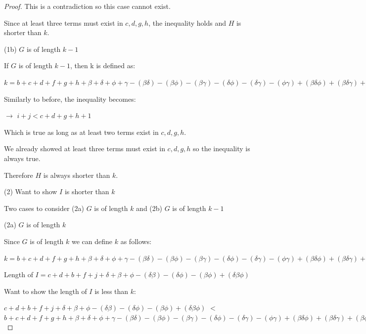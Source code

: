 \documentclass[manuscript]{acmart}
\begin{document}
\begin{proof}
        This is a contradiction so this case cannot exist.

        Since at least three terms must exist in {$c, d, g, h$}, the
        inequality holds and $H$ is shorter than $k$.

        (1b) $G$ is of length $k - 1$

        If $G$ is of length $k - 1$, then k is defined as:

        $k = b + c + d + f + g + h
            + \beta + \delta + \phi + \gamma
            - (\beta \delta) - (\beta \phi) - (\beta \gamma) - (\delta \phi) - (\delta \gamma) -(\phi \gamma)
            + (\beta \delta \phi) + (\beta \delta \gamma) + (\beta \phi \gamma) + (\delta \phi \gamma)
            - (\beta \delta \phi \gamma)
            + 1
        $

        Similarly to before, the inequality becomes:

        $\rightarrow$ $i + j < c + d + g + h + 1$

        Which is true as long as at least two terms exist in {$c, d, g, h$}.

        We already showed at least three terms must exist in {$c, d, g, h$}
        so the inequality is always true.

        Therefore $H$ is always shorter than $k$. 

        (2) Want to show $I$ is shorter than $k$

        Two cases to consider (2a) $G$ is of length $k$ and (2b) $G$ is of length $k - 1$

        (2a) $G$ is of length $k$

        Since $G$ is of length $k$ we can define $k$ as follows:

        $k = b + c + d + f + g + h
            + \beta + \delta + \phi + \gamma
            - (\beta \delta) - (\beta \phi) - (\beta \gamma) - (\delta \phi) - (\delta \gamma) -(\phi \gamma)
            + (\beta \delta \phi) + (\beta \delta \gamma) + (\beta \phi \gamma) + (\delta \phi \gamma)
            - (\beta \delta \phi \gamma)
        $

        Length of $I = c + d + b + f + j
        + \delta + \beta + \phi
        - (\delta \beta) - (\delta \phi) - (\beta \phi)
        + (\delta \beta \phi)
        $

        Want to show the length of $I$ is less than $k$:

        $c + d + b + f + j
        + \delta + \beta + \phi
        - (\delta \beta) - (\delta \phi) - (\beta \phi)
        + (\delta \beta \phi)
        $
        $<$
        $b + c + d + f + g + h
            + \beta + \delta + \phi + \gamma
            - (\beta \delta) - (\beta \phi) - (\beta \gamma) - (\delta \phi) - (\delta \gamma) -(\phi \gamma)
            + (\beta \delta \phi) + (\beta \delta \gamma) + (\beta \phi \gamma) + (\delta \phi \gamma)
            - (\beta \delta \phi \gamma)
        $


\end{proof}
\end{document}
